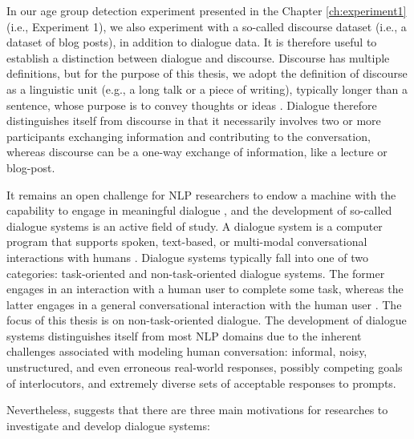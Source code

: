 In our age group detection experiment presented in the Chapter \ref{ch:experiment1} (i.e., Experiment 1), we also experiment with a so-called discourse dataset (i.e., a dataset of blog posts), in addition to dialogue data. It is therefore useful to establish a distinction between dialogue and discourse. Discourse has multiple definitions, but for the purpose of this thesis, we adopt the definition of discourse as a linguistic unit (e.g., a long talk or a piece of writing), typically longer than a sentence, whose purpose is to convey thoughts or ideas \citep{MerriamWebster2021Dialogue_Entry}. Dialogue therefore distinguishes itself from discourse in that it necessarily involves two or more participants exchanging information and contributing to the conversation, whereas discourse can be a one-way exchange of information, like a lecture or blog-post.




It remains an open challenge for NLP researchers to endow a machine with the capability to engage in meaningful dialogue \citep{burtsev-etal-2018-deeppavlov}, and the development of so-called dialogue systems is an active field of study.
A dialogue system is a computer program that supports spoken, text-based, or multi-modal conversational interactions with humans \citep{mctear2020conversational}.
Dialogue systems typically fall into one of two categories: task-oriented and non-task-oriented dialogue systems. The former engages in an interaction with a human user to complete some task, whereas the latter engages in a general conversational interaction with the human user \citep{Kushneryk2019IntelligentDS}. The focus of this thesis is on non-task-oriented dialogue.
The development of dialogue systems distinguishes itself from most NLP domains due to the inherent challenges associated with modeling human conversation: informal, noisy, unstructured, and even erroneous real-world responses, possibly competing goals of interlocutors, and extremely diverse sets of acceptable responses to prompts.

Nevertheless, \cite{mctear2020conversational} suggests that there are three main motivations for researches to investigate and develop dialogue systems:

